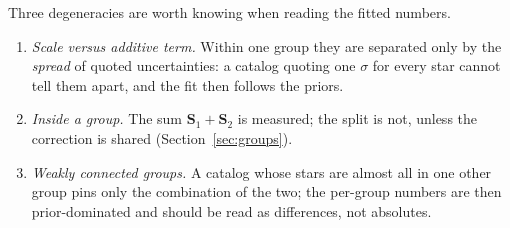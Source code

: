\documentclass[11pt,a4paper]{article}
\newcommand{\bM}[1]{\boldsymbol{#1}}          %
\begin{document}
Three degeneracies are worth knowing when reading the fitted numbers.
\begin{enumerate}
  \item \emph{Scale versus additive term.} Within one group they are separated
  only by the \emph{spread} of quoted uncertainties: a catalog quoting one
  $\sigma$ for every star cannot tell them apart, and the fit then follows the
  priors.
  \item \emph{Inside a group.} The sum $\bM S_1+\bM S_2$ is measured; the split
  is not, unless the correction is shared (Section~\ref{sec:groups}).
  \item \emph{Weakly connected groups.} A catalog whose stars are almost all in
  one other group pins only the combination of the two; the per-group numbers are
  then prior-dominated and should be read as differences, not absolutes.
\end{enumerate}
\end{document}
